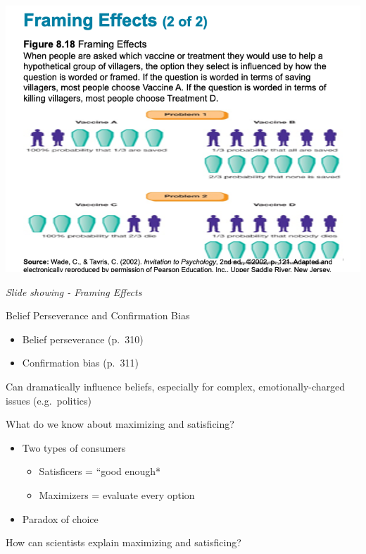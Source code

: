\documentclass[
]{book}
\providecommand{\tightlist}{%
  \setlength{\itemsep}{0pt}\setlength{\parskip}{0pt}}
\begin{document}
\includegraphics{assets/unit_1/slide_63.png}

\emph{Slide showing - Framing Effects}

Belief Perseverance and Confirmation Bias

\begin{itemize}
\tightlist
\item
  Belief perseverance (p.~310)\\
\item
  Confirmation bias (p.~311)
\end{itemize}

Can dramatically influence beliefs, especially for complex, emotionally-charged issues (e.g.~politics)

What do we know about maximizing and satisficing?

\begin{itemize}
\tightlist
\item
  Two types of consumers

  \begin{itemize}
  \tightlist
  \item
    Satisficers = ``good enough*\\
  \item
    Maximizers = evaluate every option\\
  \end{itemize}
\item
  Paradox of choice
\end{itemize}

How can scientists explain maximizing and satisficing?
\end{document}
